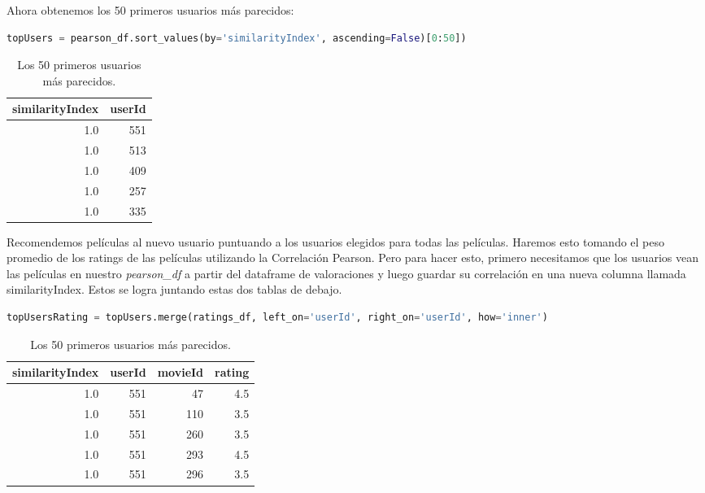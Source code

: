 \documentclass{uimppracticas}
\begin{document}
Ahora obtenemos los 50 primeros usuarios más parecidos:

\begin{lstlisting}[language=python, basicstyle=\small]
topUsers = pearson_df.sort_values(by='similarityIndex', ascending=False)[0:50])
\end{lstlisting}

\begin{table}[h]
	\centering
	\begin{tabular}{rr}
		\toprule
		similarityIndex &  userId \\
		\midrule
		1.0 &     551 \\
		1.0 &     513 \\
		1.0 &     409 \\
		1.0 &     257 \\
		1.0 &     335 \\
		\bottomrule
	\end{tabular}
	\caption{Los 50 primeros usuarios más parecidos.}
	\label{usuarios_parecidos}
\end{table}

Recomendemos películas al nuevo usuario puntuando a los usuarios elegidos para todas las películas. Haremos esto tomando el peso promedio de los ratings de las películas utilizando la Correlación Pearson. Pero para hacer esto, primero necesitamos que los usuarios vean las películas en nuestro \textit{pearson\_df} a partir del dataframe de valoraciones y luego guardar su correlación en una nueva columna llamada similarityIndex. Estos se logra juntando estas dos tablas de debajo.

\begin{lstlisting}[language=python, basicstyle=\small]
topUsersRating = topUsers.merge(ratings_df, left_on='userId', right_on='userId', how='inner')
\end{lstlisting}

\begin{table}[h]
	\centering
	\begin{tabular}{rrrr}
		\toprule
		similarityIndex &  userId &  movieId &  rating \\
		\midrule
		1.0 &     551 &       47 &     4.5 \\
		1.0 &     551 &      110 &     3.5 \\
		1.0 &     551 &      260 &     3.5 \\
		1.0 &     551 &      293 &     4.5 \\
		1.0 &     551 &      296 &     3.5 \\
		\bottomrule
	\end{tabular}
	\caption{Los 50 primeros usuarios más parecidos.}
	\label{usuarios_parecidos}
\end{table}
\end{document}
